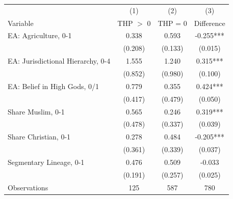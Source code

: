 \begin{tabular}{l*{3}c}
\toprule
 & (1) & (2) & (3) \\
Variable & THP $>$ 0 & THP = 0 & Difference \\
\midrule
EA: Agriculture, 0-1&0.338&0.593&-0.255***\\
&(0.208)&(0.133)&(0.015)\\
EA: Jurisdictional Hierarchy, 0-4&1.555&1.240&0.315***\\
&(0.852)&(0.980)&(0.100)\\
EA: Belief in High Gods, 0/1&0.779&0.355&0.424***\\
&(0.417)&(0.479)&(0.050)\\
Share Muslim, 0-1&0.565&0.246&0.319***\\
&(0.478)&(0.337)&(0.039)\\
Share Christian, 0-1&0.278&0.484&-0.205***\\
&(0.361)&(0.339)&(0.037)\\
Segmentary Lineage, 0-1&0.476&0.509&-0.033\\
&(0.191)&(0.257)&(0.025)\\
\midrule
Observations & 125 & 587 & 780 \\
\bottomrule
\end{tabular}
